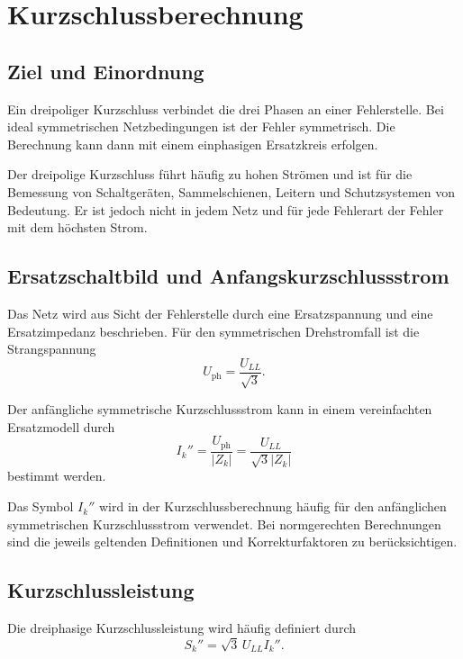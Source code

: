 \chapter{Kurzschlussberechnung}
\label{chap:08-kurzschlussberechnung}


\section{Ziel und Einordnung}

Ein dreipoliger Kurzschluss verbindet die drei Phasen an einer Fehlerstelle.
Bei ideal symmetrischen Netzbedingungen ist der Fehler symmetrisch.
Die Berechnung kann dann mit einem einphasigen Ersatzkreis erfolgen.

Der dreipolige Kurzschluss führt häufig zu hohen Strömen und ist für die
Bemessung von Schaltgeräten, Sammelschienen, Leitern und Schutzsystemen
von Bedeutung. Er ist jedoch nicht in jedem Netz und für jede Fehlerart
der Fehler mit dem höchsten Strom.

\section{Ersatzschaltbild und Anfangskurzschlussstrom}

Das Netz wird aus Sicht der Fehlerstelle durch eine Ersatzspannung und
eine Ersatzimpedanz beschrieben. Für den symmetrischen Drehstromfall
ist die Strangspannung
\[
  U_{\mathrm{ph}}=\frac{U_{LL}}{\sqrt{3}}.
\]

Der anfängliche symmetrische Kurzschlussstrom kann in einem vereinfachten
Ersatzmodell durch
\[
  I_k''=\frac{U_{\mathrm{ph}}}{|Z_k|}
  =\frac{U_{LL}}{\sqrt{3}|Z_k|}
\]
bestimmt werden.

Das Symbol \(I_k''\) wird in der Kurzschlussberechnung häufig für den
anfänglichen symmetrischen Kurzschlussstrom verwendet. Bei normgerechten
Berechnungen sind die jeweils geltenden Definitionen und Korrekturfaktoren
zu berücksichtigen.

\section{Kurzschlussleistung}

Die dreiphasige Kurzschlussleistung wird häufig definiert durch
\[
  S_k''=\sqrt{3}\,U_{LL}I_k''.
\]

